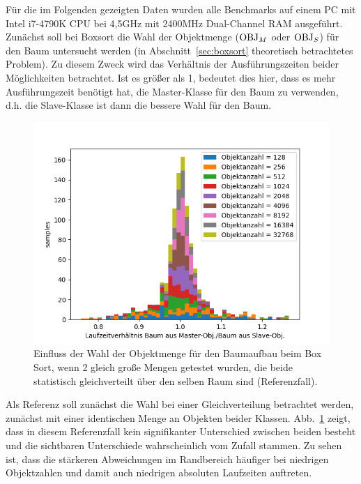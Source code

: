 Für die im Folgenden gezeigten Daten wurden alle Benchmarks auf einem PC mit Intel i7-4790K CPU bei 4,5GHz mit 2400MHz Dual-Channel RAM ausgeführt.\\
Zunächst soll bei Boxsort die Wahl der Objektmenge ($\operatorname{OBJ}_M$ oder $\operatorname{OBJ}_S$) für den Baum untersucht werden (in Abschnitt~\ref{sec:boxsort} theoretisch betrachtetes Problem). Zu diesem Zweck wird das Verhältnis der Ausführungszeiten beider Möglichkeiten betrachtet. Ist es größer als 1, bedeutet dies hier, dass es mehr Ausführungszeit benötigt hat, die Master-Klasse für den Baum zu verwenden, d.h. die Slave-Klasse ist dann die bessere Wahl für den Baum.\\

\begin{figure}
    \centering
    \includegraphics[width=1.0\textwidth]{./res/boxsortChoice-reference.png}
    \caption{
    Einfluss der Wahl der Objektmenge für den Baumaufbau beim Box Sort, wenn 2 gleich große Mengen getestet wurden, die beide statistisch gleichverteilt über den selben Raum sind (Referenzfall).}
    \label{fig:boxsortCoice-reference}
\end{figure}

Als Referenz soll zunächst die Wahl bei einer Gleichverteilung betrachtet werden, zunächst mit einer identischen Menge an Objekten beider Klassen. Abb.~\ref{fig:boxsortCoice-reference} zeigt, dass in diesem Referenzfall kein signifikanter Unterschied zwischen beiden besteht und die sichtbaren Unterschiede wahrscheinlich vom Zufall stammen. Zu sehen ist, dass die stärkeren Abweichungen im Randbereich häufiger bei niedrigen Objektzahlen und damit auch niedrigen absoluten Laufzeiten auftreten.\\


